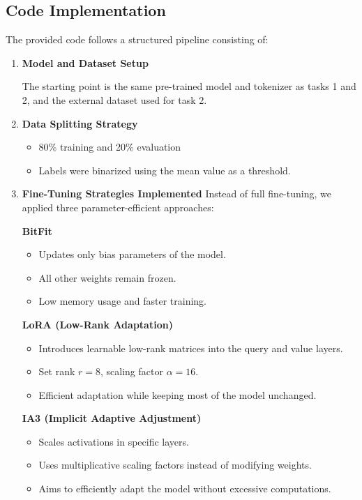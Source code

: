 \documentclass[11pt]{article}
\begin{document}
\subsection{Code Implementation}
The provided code follows a structured pipeline consisting of:
\begin{enumerate}
  \item \textbf{Model and Dataset Setup}
  
    The starting point is the same pre-trained model and tokenizer as tasks 1 and 2, and the external dataset used for task 2.
\item \textbf{Data Splitting Strategy}
\begin{itemize}
    \item 80\% training and 20\% evaluation
    \item Labels were binarized using the mean value as a threshold.
\end{itemize}
\item \textbf{Fine-Tuning Strategies Implemented}
Instead of full fine-tuning, we applied three parameter-efficient approaches:

\textbf{BitFit}
\begin{itemize}
    \item Updates only bias parameters of the model.
    \item All other weights remain frozen.
    \item Low memory usage and faster training.
\end{itemize}

\textbf{LoRA (Low-Rank Adaptation)}
\begin{itemize}
    \item Introduces learnable low-rank matrices into the query and value layers.
    \item Set rank \( r = 8 \), scaling factor \( \alpha = 16 \).
    \item Efficient adaptation while keeping most of the model unchanged.
\end{itemize}

\textbf{IA3 (Implicit Adaptive Adjustment)}
\begin{itemize}
    \item Scales activations in specific layers.
    \item Uses multiplicative scaling factors instead of modifying weights.
    \item Aims to efficiently adapt the model without excessive computations.
\end{itemize}


\end{enumerate}
\end{document}
